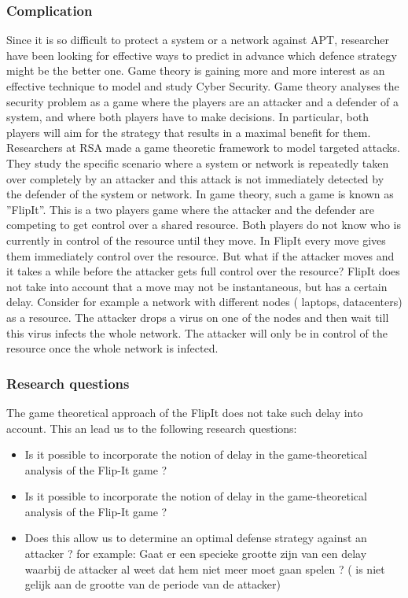 \subsubsection{Complication}
Since it is so difficult to protect a system or a network against APT, researcher have been looking for effective ways to predict in advance which defence strategy might be the better one. 
Game theory is gaining more and more interest as an effective technique to  model and study Cyber Security. Game theory analyses the security problem as a game where the players are an attacker and a defender of a system, and where both players have to make decisions. In particular, both players will aim for the strategy that results in a maximal benefit for them.  Researchers at RSA made a game theoretic framework to model targeted attacks. They study the specific scenario where a system or network is repeatedly taken over completely by an attacker and this attack is not immediately detected by the defender of the system or network. In game theory, such a game is known as ''FlipIt''. This is a two players game where the attacker and the defender are competing to get control over a shared resource. Both players do not know who is currently in control of the resource until they move. In FlipIt every move gives them immediately control over the resource. But what if the attacker moves and it takes a while before the attacker gets full control over the resource? FlipIt does not take into account that a move may not be instantaneous, but has a certain delay. Consider for example a network with different nodes ( laptops, datacenters) as a resource. The attacker drops a virus on one of the nodes and then wait till this virus infects the whole network. The attacker will only be in control of the resource once the whole network is infected. \\

\subsubsection{Research questions}
The game theoretical approach of the FlipIt does not take such delay into account. 
This an lead us to the following research questions:
\begin{itemize}
\item Is it possible to incorporate the notion of delay in the game-theoretical analysis of the Flip-It game ?
\item Is it possible to incorporate the notion of delay in the game-theoretical analysis of the Flip-It game ?
\item Does this allow us to determine an optimal defense strategy against an attacker ? for example: Gaat er een specieke grootte zijn van een delay waarbij de attacker al weet dat hem niet meer moet gaan spelen ? ( is niet gelijk aan de grootte van de periode van de attacker)
\end{itemize}



